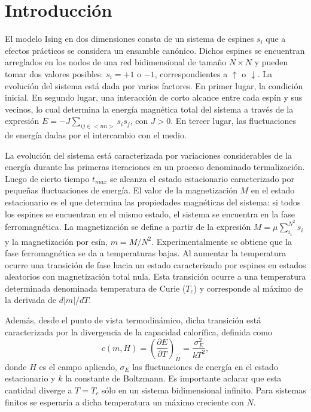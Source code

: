 \documentclass[aps,prb,twocolumn,superscriptaddress,floatfix,longbibliography]{revtex4-2}
\begin{document}
\section{Introducción}

El modelo Ising en dos dimensiones consta de un sistema de espines ${s_i}$ que a efectos prácticos se considera un ensamble canónico. Dichos espines se encuentran arreglados en los nodos de una red bidimensional de tamaño $N \times N$ y pueden tomar dos valores posibles: $s_i = +1$ o $-1$, correspondientes a $\uparrow$ o $\downarrow$. La evolución del sistema está dada por varios factores. En primer lugar, la condición inicial. En segundo lugar, una interacción de corto alcance entre cada espín y sus vecinos, lo cual determina la energía magnética total del sistema a través de la expresión $E = - J \sum_{{i j \in <nn>}} s_i s_j$, con $J>0$. En tercer lugar, las fluctuaciones de energía dadas por el intercambio con el medio.

La evolución del sistema está caracterizada por variaciones considerables de la energía durante las primeras iteraciones en un proceso denominado termalización. Luego de cierto tiempo $t_{max}$ se alcanza el estado estacionario caracterizado por pequeñas fluctuaciones de energía. El valor de la magnetización $M$ en el estado estacionario es el que determina las propiedades magnéticas del sistema: si todos los espines se encuentran en el mismo estado, el sistema se encuentra en la fase ferromagnética. La magnetización se define a partir de la expresión $M = \mu \sum_{i_1}^{N^2} s_i$ y la magnetización por esín, $m = M/{N^2}$. Experimentalmente se obtiene que la fase ferromagnética se da a temperaturas bajas. Al aumentar la temperatura ocurre una transición de fase hacia un estado caracterizado por espines en estados aleatorios con magnetización total nula. Esta transición ocurre a una temperatura determinada denominada temperatura de Curie ($T_c$) y corresponde al máximo de la derivada de $d|m|/dT$.


Además, desde el punto de vista termodinámico, dicha transición está caracterizada por la divergencia de la capacidad calorífica, definida como
\begin{equation}
c(m, H) = \left( \frac{\partial E}{\partial T}  \right)_H = \frac{\sigma_E^2}{k T^2},
\label{eq:capacidad_calorifica}
\end{equation}
donde $H$ es el campo aplicado, $\sigma_E$ las fluctuaciones de energía en el estado estacionario y $k$ la constante de Boltzmann. Es importante aclarar que esta cantidad diverge a $T = T_c$ sólo en un sistema bidimensional infinito. Para sistemas finitos se esperaría a dicha temperatura un máximo creciente con $N$.
\end{document}
